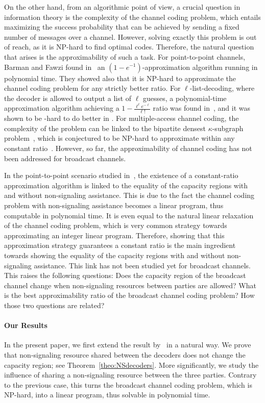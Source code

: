 On the other hand, from an algorithmic point of view, a crucial question in information theory is the complexity of the channel coding problem, which entails maximizing the success probability that can be achieved by sending a fixed number of messages over a channel. However, solving exactly this problem is out of reach, as it is \textrm{NP}-hard to find optimal codes. Therefore, the natural question that arises is the approximability of such a task. For point-to-point channels, Barman and Fawzi found in~\cite{BF18} an $(1-e^{-1})$-approximation algorithm running in polynomial time. They showed also that it is \textrm{NP}-hard to approximate the channel coding problem for any strictly better ratio. For $\ell$-list-decoding, where the decoder is allowed to output a list of $\ell$ guesses, a polynomial-time approximation algorithm achieving a $1-\frac{\ell^{\ell}e^{-\ell}}{\ell!}$ ratio was found in~\cite{BFGG20}, and it was shown to be -hard to do better in \cite{DMMS20}. For multiple-access channel coding, the complexity of the problem can be linked to the bipartite densest $\kappa$-subgraph problem~\cite{FKP01}, which is conjectured to be \textrm{NP}-hard to approximate within any constant ratio~\cite{AAMMW11}. However, so far, the approximability of channel coding has not been addressed for broadcast channels.

In the point-to-point scenario studied in~\cite{BF18}, the existence of a constant-ratio approximation algorithm is linked to the equality of the capacity regions with and without non-signaling assistance. This is due to the fact the channel coding problem with non-signaling assistance becomes a linear program, thus computable in polynomial time. It is even equal to the natural linear relaxation of the channel coding problem, which is very common strategy towards approximating an integer linear program. Therefore, showing that this approximation strategy guarantees a constant ratio is the main ingredient towards showing the equality of the capacity regions with and without non-signaling assistance. This link has not been studied yet for broadcast channels. This raises the following questions: Does the capacity region of the broadcast channel change when non-signaling resources between parties are allowed? What is the best approximability ratio of the broadcast channel coding problem? How those two questions are related?


\paragraph{Our Results} In the present paper, we first extend the result by~\cite{PDB21} in a natural way. We prove that non-signaling resource shared between the decoders does not change the capacity region; see Theorem~\ref{theo:NSdecoders}. More significantly, we study the influence of sharing a non-signaling resource between the three parties. Contrary to the previous case, this turns the broadcast channel coding problem, which is \textrm{NP}-hard, into a linear program, thus solvable in polynomial time.


